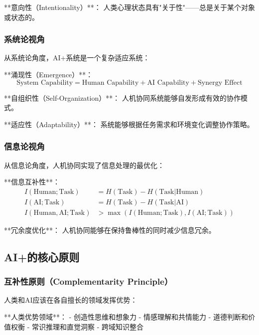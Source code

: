 **意向性（Intentionality）**：
人类心理状态具有"关于性"——总是关于某个对象或状态的。

\subsubsection{系统论视角}

从系统论角度，AI+系统是一个复杂适应系统：

**涌现性（Emergence）**：
\begin{equation}
\text{System Capability} = \text{Human Capability} + \text{AI Capability} + \text{Synergy Effect}
\end{equation}

**自组织性（Self-Organization）**：
人机协同系统能够自发形成有效的协作模式。

**适应性（Adaptability）**：
系统能够根据任务需求和环境变化调整协作策略。

\subsubsection{信息论视角}

从信息论角度，人机协同实现了信息处理的最优化：

**信息互补性**：
\begin{align}
I(\text{Human}; \text{Task}) &= H(\text{Task}) - H(\text{Task}|\text{Human}) \\
I(\text{AI}; \text{Task}) &= H(\text{Task}) - H(\text{Task}|\text{AI}) \\
I(\text{Human}, \text{AI}; \text{Task}) &> \max(I(\text{Human}; \text{Task}), I(\text{AI}; \text{Task}))
\end{align}

**冗余度优化**：
人机协同能够在保持鲁棒性的同时减少信息冗余。

\subsection{AI+的核心原则} %

\subsubsection{互补性原则（Complementarity Principle）}

人类和AI应该在各自擅长的领域发挥优势：

**人类优势领域**：
- 创造性思维和想象力
- 情感理解和共情能力
- 道德判断和价值权衡
- 常识推理和直觉洞察
- 跨域知识整合

